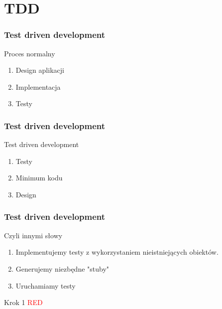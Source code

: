 \documentclass[slidestop,compress,mathserif]{beamer}
\begin{document}

\section{TDD}
\begin{frame}
\frametitle{Test driven development}
Proces normalny
 \begin{enumerate}
  \item Design aplikacji
  \pause \item Implementacja
  \pause \item Testy 
\end{enumerate}
\end{frame}

\begin{frame}
\frametitle{Test driven development}
Test driven development
 \begin{enumerate}
  \item Testy
  \pause \item Minimum kodu
  \pause \item Design %
\end{enumerate}
\end{frame}

\begin{frame}
\frametitle{Test driven development}
Czyli innymi słowy
 \begin{enumerate}
\item Implementujemy testy z wykorzystaniem nieistniejących obiektów.
\pause \item Generujemy niezbędne "stuby"
\pause \item Uruchamiamy testy
\end{enumerate}
\pause
\begin{block}{Krok 1}
	\textcolor{red}{RED}
\end{block}
\end{frame}
\end{document}
